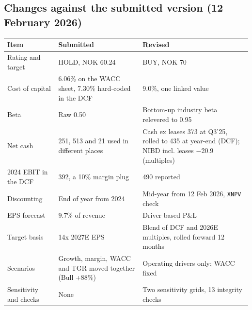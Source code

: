 \documentclass[10pt,a4paper]{article}
\begin{document}
\subsection{Changes against the submitted version (12 February 2026)}
\begin{center}
\small
\begin{tabularx}{\textwidth}{@{}lXX@{}}
\toprule
\textbf{Item} & \textbf{Submitted} & \textbf{Revised} \\
\midrule
Rating and target & HOLD, NOK 60.24 & BUY, NOK 70 \\
Cost of capital & 6.06\% on the WACC sheet, 7.30\% hard-coded in the DCF & 9.0\%, one linked value \\
Beta & Raw 0.50 & Bottom-up industry beta relevered to 0.95 \\
Net cash & 251, 513 and 21 used in different places & Cash ex leases 373 at Q3'25, rolled to 435 at year-end (DCF); NIBD incl. leases $-$20.9 (multiples) \\
2024 EBIT in the DCF & 392, a 10\% margin plug & 490 reported \\
Discounting & End of year from 2024 & Mid-year from 12 Feb 2026, \texttt{XNPV} check \\
EPS forecast & 9.7\% of revenue & Driver-based P\&L \\
Target basis & 14x 2027E EPS & Blend of DCF and 2026E multiples, rolled forward 12 months \\
Scenarios & Growth, margin, WACC and TGR moved together (Bull +88\%) & Operating drivers only; WACC fixed \\
Sensitivity and checks & None & Two sensitivity grids, 13 integrity checks \\
\bottomrule
\end{tabularx}
\end{center}
\end{document}
